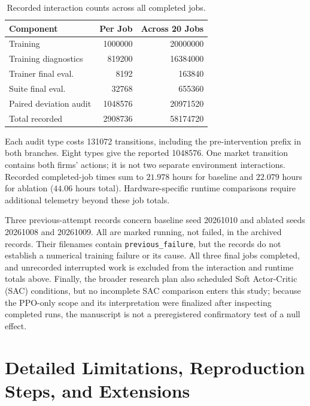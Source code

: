 \documentclass{article}
\begin{document}
\begin{table}[t]
\centering
\caption{Recorded interaction counts across all completed jobs.}
\label{tab:interactions}
\small
\begin{tabular}{@{}lrr@{}}
\toprule
Component & Per Job & Across 20 Jobs \\
\midrule
Training              & \num{1000000}  & \num{20000000} \\
Training diagnostics  & \num{819200}   & \num{16384000} \\
Trainer final eval.   & \num{8192}     & \num{163840} \\
Suite final eval.     & \num{32768}    & \num{655360} \\
Paired deviation audit & \num{1048576} & \num{20971520} \\
\midrule
Total recorded        & \num{2908736}  & \num{58174720} \\
\bottomrule
\end{tabular}
\end{table}

Each audit type costs \num{131072} transitions, including the pre-intervention prefix in both branches. Eight types give the reported \num{1048576}. One market transition contains both firms' actions; it is not two separate environment interactions. Recorded completed-job times sum to $21.978$ hours for baseline and $22.079$ hours for ablation ($44.06$ hours total). Hardware-specific runtime comparisons require additional telemetry beyond these job totals.

Three previous-attempt records concern baseline seed 20261010 and ablated seeds 20261008 and 20261009. All are marked running, not failed, in the archived records. Their filenames contain \texttt{previous\_failure}, but the records do not establish a numerical training failure or its cause. All three final jobs completed, and unrecorded interrupted work is excluded from the interaction and runtime totals above. Finally, the broader research plan also scheduled Soft Actor-Critic (SAC) conditions, but no incomplete SAC comparison enters this study; because the PPO-only scope and its interpretation were finalized after inspecting completed runs, the manuscript is not a preregistered confirmatory test of a null effect.

\section{Detailed Limitations, Reproduction Steps, and Extensions}
\end{document}
